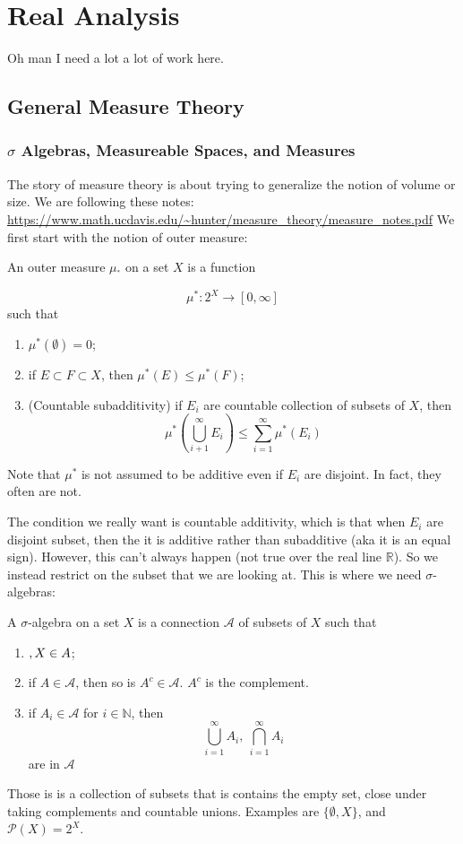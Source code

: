 \documentclass[main.tex]{subfiles}
\begin{document}
\section{Real Analysis}

Oh man I need a lot a lot of work here. 

\subsection{General Measure Theory}

\subsubsection{$\sigma$ Algebras, Measureable Spaces, and Measures}
The story of measure theory is about trying to generalize the notion of volume or size. 
We are following these notes: \url{https://www.math.ucdavis.edu/~hunter/measure_theory/measure_notes.pdf}
We first start with the notion of outer measure:

\begin{definition}
An outer measure $\mu_^*$ on a set $X$ is a function 

$$
\mu^* : 2^X \rightarrow [0, \infty]
$$ 
such that 
\begin{enumerate}
    \item $\mu^*(\emptyset) = 0$;
    \item if $E \subset F \subset X$, then $\mu^*(E) \leq \mu^*(F)$;
    \item (Countable subadditivity) if $E_i$ are countable collection of subsets of $X$, then 
    $$
    \mu^*(\bigcup_{i + 1} ^{\infty} E_i)\leq \sum_{i = 1} ^{\infty} \mu^*(E_i)
    $$
\end{enumerate}
\end{definition}
Note that $\mu^*$ is not assumed to be additive even if ${E_i}$ are disjoint. In fact, they often are not.

The condition we really want is countable additivity, which is that when $E_i$ are disjoint subset, then the it is additive rather than subadditive (aka it is an equal sign). However, this can't always happen (not true over the real line $\mathbb{R}$). So we instead restrict on the subset that we are looking at. This is where we need $\sigma$-algebras:

\begin{definition}
A $\sigma$-algebra on a set $X$ is a connection $\mathcal{A}$ of subsets of $X$ such that
\begin{enumerate}
    \item $\empty, X \in A$;
    \item if $A \in \mathcal{A}$, then so is $A^c \in \mathcal{A}$. $A^c$ is the complement.
    \item if $A_i \in \mathcal{A}$ for $i \in \mathbb{N}$, then 
    $$
    \bigcup_{i=1} ^{\infty} A_i,  \ \bigcap_{i=1} ^{\infty} A_i
    $$
    are in $\mathcal{A}$
\end{enumerate}
\end{definition}
Those is is a collection of subsets that is contains the empty set, close under taking complements and countable unions.
Examples are $\{ \emptyset, X \}$, and $\mathcal{P}(X) = 2^X$.
\end{document}
